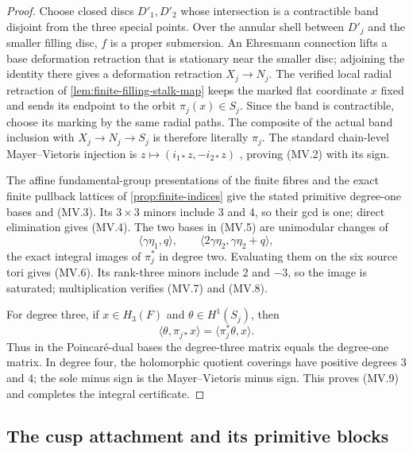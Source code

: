 \begin{proof}
Choose closed discs $D'_1,D'_2$ whose intersection is a contractible band
disjoint from the three special points.  Over the annular shell between
$D'_j$ and the smaller filling disc, $f$ is a proper submersion.  An
Ehresmann connection lifts a base deformation retraction that is stationary
near the smaller disc; adjoining the identity there gives a deformation
retraction $X_j\to N_j$.  The verified local radial retraction of
\cref{lem:finite-filling-stalk-map} keeps the marked flat coordinate $x$
fixed and sends its endpoint to the orbit $\pi_j(x)\in S_j$.  Since the band
is contractible, choose its marking by the same radial paths.  The composite
of the actual band inclusion with $X_j\to N_j\to S_j$ is therefore literally
$\pi_j$.  The standard chain-level Mayer--Vietoris injection is
$z\mapsto(i_{1*}z,-i_{2*}z)$
\cite[\S2.2]{Hatcher2002}, proving (MV.2) with its sign.

The affine fundamental-group presentations of the finite fibres and the
exact finite pullback lattices of \cref{prop:finite-indices} give the stated
primitive degree-one bases and (MV.3).  Its $3\times3$ minors include $3$
and $4$, so their gcd is one; direct elimination gives (MV.4).
The two bases in (MV.5) are unimodular changes of
\[
 \langle\gamma\eta_1,q\rangle,
 \qquad
 \langle2\gamma\eta_2,\gamma\eta_2+q\rangle,
\]
the exact integral images of $\pi_j^*$ in degree two.  Evaluating them on the
six source tori gives (MV.6).  Its rank-three minors include $2$ and $-3$,
so the image is saturated; multiplication verifies (MV.7) and (MV.8).

For degree three, if $x\in H_3(F)$ and $\theta\in H^1(S_j)$, then
\[
 \langle\theta,\pi_{j*}x\rangle
 =\langle\pi_j^*\theta,x\rangle.
\]
Thus in the Poincar\'e-dual bases the degree-three matrix equals the
degree-one matrix.  In degree four, the holomorphic quotient coverings have
positive degrees $3$ and $4$; the sole minus sign is the Mayer--Vietoris
minus sign.  This proves (MV.9) and completes the integral certificate.
\end{proof}

\subsection{The cusp attachment and its primitive blocks}

